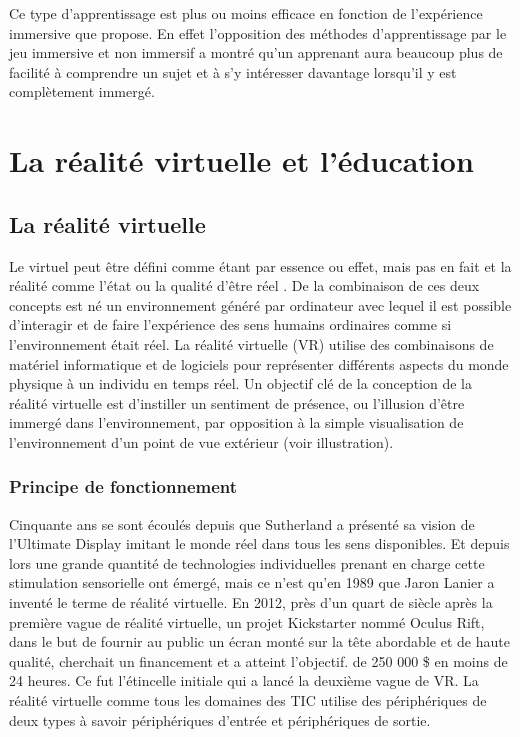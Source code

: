 Ce type d'apprentissage est plus ou moins efficace en fonction de l'expérience immersive que propose. En effet l'opposition des méthodes d'apprentissage par le jeu immersive et non immersif a montré qu'un apprenant aura beaucoup plus de facilité à comprendre un sujet et à s'y intéresser davantage lorsqu'il y est complètement immergé\cite{de2017motivational,Shackelford2019RelationshipsBC,Abdelaziz2020TheIO}.

\section{La réalité virtuelle et l'éducation}
\subsection{La réalité virtuelle}

Le virtuel peut être défini comme \og étant par essence ou effet, mais pas en fait \fg\cite{Jerald2015WhatIV} et la réalité comme \og l'état ou la qualité d'être réel \fg\cite{Jerald2015WhatIV}.
De la combinaison de ces deux concepts est né un environnement généré par ordinateur avec lequel il est possible d'interagir et de faire l'expérience des sens humains ordinaires comme si l'environnement était réel\cite{Rheingold1991VirtualR}.
La réalité virtuelle (VR) utilise des combinaisons de matériel informatique et de logiciels pour représenter différents aspects du monde physique à un individu en temps réel.
Un objectif clé de la conception de la réalité virtuelle est d'instiller un sentiment de présence, ou l'illusion d'être immergé dans l'environnement, par opposition à la simple visualisation de l'environnement d'un point de vue extérieur (voir illustration).

\subsubsection{Principe de fonctionnement}

Cinquante ans se sont écoulés depuis que Sutherland a présenté sa vision de l'Ultimate Display\cite{sutherland1965ultimate} imitant le monde réel dans tous les sens disponibles.
Et depuis lors une grande quantité de technologies individuelles prenant en charge cette stimulation sensorielle ont émergé, mais ce n'est qu'en 1989 que Jaron Lanier a inventé le terme de réalité virtuelle\cite{Rheingold1991VirtualR}.
En 2012, près d'un quart de siècle après la première vague de réalité virtuelle, un projet Kickstarter nommé Oculus Rift, dans le but de fournir au public un écran monté sur la tête abordable et de haute qualité, cherchait un financement et a atteint l'objectif. de 250 000 \$ en moins de 24 heures. Ce fut l'étincelle initiale qui a lancé la deuxième vague de VR\cite{anthes2016state}.
La réalité virtuelle comme tous les domaines des TIC utilise des périphériques de deux types à savoir périphériques d'entrée et périphériques de sortie.

